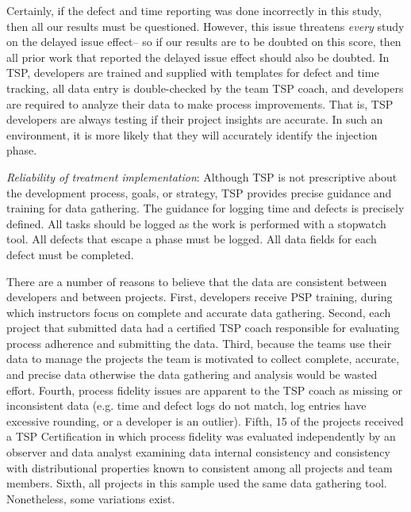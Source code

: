 \documentclass[smallcondensed]{svjour3}
\begin{document}
Certainly, if the defect and time reporting was done
incorrectly in this study, then all our results must be questioned.
However,  this issue threatens {\em every} study on the delayed
issue effect-- so if our results are to be doubted on this score,
then all prior work that reported the delayed issue effect should
also be doubted.  In TSP, developers are trained and supplied with templates for defect and time tracking, all data entry is double-checked by the team TSP coach, and developers are required to analyze their data to make process improvements. That is, TSP developers are always testing
if their project insights are accurate. In such an environment,
it is more likely that they will accurately identify the injection phase.

\textit{Reliability of treatment implementation}: 
Although TSP is not prescriptive about the development process, goals, or strategy, TSP provides precise guidance and training for data gathering. The guidance for logging time and defects is precisely defined. All tasks should be logged as the work is performed with a stopwatch tool. All defects that escape a phase must be logged. All data fields for each defect must be completed.

There are a number of reasons to believe that the data are consistent between developers and between projects. First, developers receive PSP training, during which instructors focus on complete and accurate data gathering. Second, each project that submitted data had a certified TSP coach responsible for evaluating  process adherence and submitting the data. Third, because the teams use their data to manage the projects the team is motivated to collect complete, accurate, and precise data otherwise the data gathering and analysis would be wasted effort. Fourth, process fidelity issues are apparent to the TSP coach as missing or inconsistent data (e.g. time and defect logs do not match, log entries have excessive rounding, or a developer is an outlier). Fifth, 15 of the projects received a TSP Certification in which process fidelity was evaluated independently by an observer and data analyst examining data internal consistency and consistency with  distributional properties known to consistent among all projects and team members. Sixth, all projects in this sample used the same data gathering tool. Nonetheless, some variations exist. 
\end{document}
